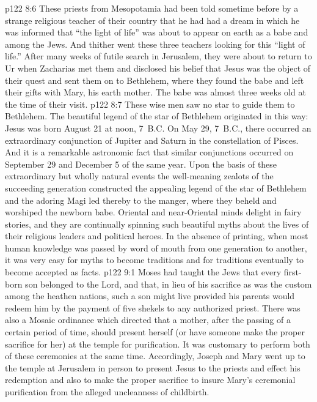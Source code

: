 \vs p122 8:6 These priests from Mesopotamia had been told sometime before by a strange religious teacher of their country that he had had a dream in which he was informed that “the light of life” was about to appear on earth as a babe and among the Jews. And thither went these three teachers looking for this “light of life.” After many weeks of futile search in Jerusalem, they were about to return to Ur when Zacharias met them and disclosed his belief that Jesus was the object of their quest and sent them on to Bethlehem, where they found the babe and left their gifts with Mary, his earth mother. The babe was almost three weeks old at the time of their visit.
\vs p122 8:7 These wise men saw no star to guide them to Bethlehem. The beautiful legend of the star of Bethlehem originated in this way: Jesus was born August 21 at noon, 7~B.C. On May 29, 7~B.C., there occurred an extraordinary conjunction of Jupiter and Saturn in the constellation of Pisces. And it is a remarkable astronomic fact that similar conjunctions occurred on September 29 and December 5 of the same year. Upon the basis of these extraordinary but wholly natural events the well\hyp{}meaning zealots of the succeeding generation constructed the appealing legend of the star of Bethlehem and the adoring Magi led thereby to the manger, where they beheld and worshiped the newborn babe. Oriental and near\hyp{}Oriental minds delight in fairy stories, and they are continually spinning such beautiful myths about the lives of their religious leaders and political heroes. In the absence of printing, when most human knowledge was passed by word of mouth from one generation to another, it was very easy for myths to become traditions and for traditions eventually to become accepted as facts.
\vs p122 9:1 Moses had taught the Jews that every first\hyp{}born son belonged to the Lord, and that, in lieu of his sacrifice as was the custom among the heathen nations, such a son might live provided his parents would redeem him by the payment of five shekels to any authorized priest. There was also a Mosaic ordinance which directed that a mother, after the passing of a certain period of time, should present herself (or have someone make the proper sacrifice for her) at the temple for purification. It was customary to perform both of these ceremonies at the same time. Accordingly, Joseph and Mary went up to the temple at Jerusalem in person to present Jesus to the priests and effect his redemption and also to make the proper sacrifice to insure Mary’s ceremonial purification from the alleged uncleanness of childbirth.\plusone
